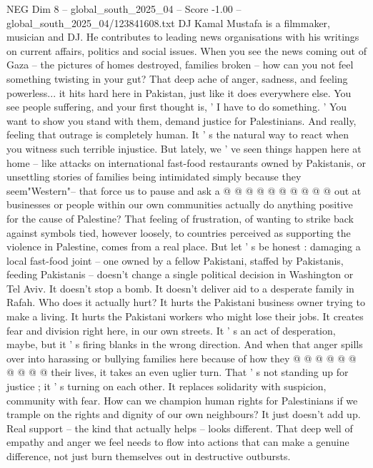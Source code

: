 \begin{textsample}{NEG Dim 8 – global\_south\_2025\_04 – Score -1.00 – global\_south\_2025\_04/123841608.txt}  \label{ex:f8_neg_285}
DJ Kamal Mustafa is a filmmaker, musician and DJ.
He contributes to leading news organisations with his writings on current affairs, politics and social issues.
When you see the news coming out of Gaza -- the pictures of homes destroyed, families broken -- how can you not feel something twisting in your gut?
That deep ache of anger, sadness, and feeling powerless... it hits hard here in Pakistan, just like it does everywhere else.
You see people suffering, and your first thought is, ' I have to do something. ' You want to show you stand with them, demand justice for Palestinians.
And really, feeling that outrage is completely human.
It ' s the natural way to react when you witness such terrible injustice.
But lately, we ' ve seen things happen here at home -- like attacks on international fast-food restaurants owned by Pakistanis, or unsettling stories of families being intimidated simply because they seem"Western"-- that force us to pause and ask a @ @ @ @ @ @ @ @ @ @ out at businesses or people within our own communities actually do anything positive for the cause of Palestine?
That feeling of frustration, of wanting to strike back against symbols tied, however loosely, to countries perceived as supporting the violence in Palestine, comes from a real place.
But let ' s be honest : damaging a local fast-food joint -- one owned by a fellow Pakistani, staffed by Pakistanis, feeding Pakistanis -- doesn't change a single political decision in Washington or Tel Aviv.
It doesn't stop a bomb.
It doesn't deliver aid to a desperate family in Rafah.
Who does it actually hurt?
It hurts the Pakistani business owner trying to make a living.
It hurts the Pakistani workers who might lose their jobs.
It creates fear and division right here, in our own streets.
It ' s an act of desperation, maybe, but it ' s firing blanks in the wrong direction.
And when that anger spills over into harassing or bullying families here because of how they @ @ @ @ @ @ @ @ @ @ their lives, it takes an even uglier turn.
That ' s not standing up for justice ; it ' s turning on each other.
It replaces solidarity with suspicion, community with fear.
How can we champion human rights for Palestinians if we trample on the rights and dignity of our own neighbours?
It just doesn't add up.
Real support -- the kind that actually helps -- looks different.
That deep well of empathy and anger we feel needs to flow into actions that can make a genuine difference, not just burn themselves out in destructive outbursts.

\end{textsample}
